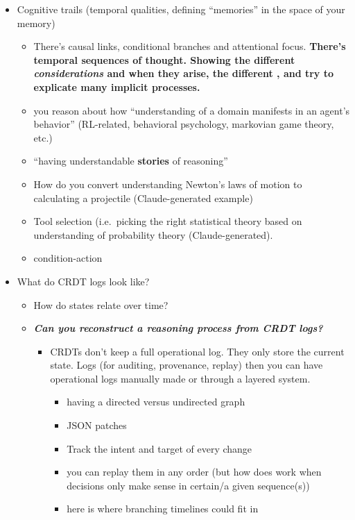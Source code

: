 \documentclass[
]{article}
\begin{document}
\begin{itemize}
\item
  Cognitive trails (temporal qualities, defining ``memories'' in the
  space of your memory)

  \begin{itemize}
  \item
    There's causal links, conditional branches and attentional focus.
    \textbf{There's temporal sequences of thought. Showing the different
    \emph{considerations} and when they arise, the different , and try
    to explicate many implicit processes.}
  \item
    you reason about how ``understanding of a domain manifests in an
    agent's behavior'' (RL-related, behavioral psychology, markovian
    game theory, etc.)
  \item
    ``having understandable \textbf{stories} of reasoning''
  \end{itemize}

  \begin{itemize}
  \item
    How do you convert understanding Newton's laws of motion to
    calculating a projectile (Claude-generated example)
  \item
    Tool selection (i.e.~picking the right statistical theory based on
    understanding of probability theory (Claude-generated).
  \item
    condition-action
  \end{itemize}
\item
  What do CRDT logs look like?

  \begin{itemize}
  \item
    How do states relate over time?
  \item
    \textbf{\emph{Can you reconstruct a reasoning process from CRDT
    logs?}}

    \begin{itemize}
    \item
      CRDTs don't keep a full operational log. They only store the
      current state. Logs (for auditing, provenance, replay) then you
      can have operational logs manually made or through a layered
      system.

      \begin{itemize}
      \item
        having a directed versus undirected graph
      \item
        JSON patches
      \item
        Track the intent and target of every change
      \item
        you can replay them in any order (but how does work when
        decisions only make sense in certain/a given sequence(s))
      \item
        here is where branching timelines could fit in
      \end{itemize}


\end{itemize}
\end{itemize}
\end{itemize}
\end{document}
